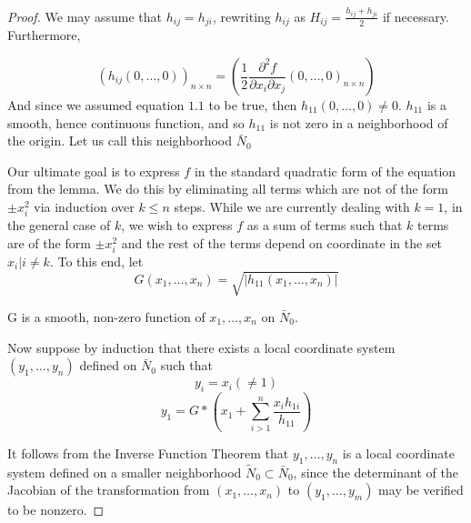 \documentclass[]{article}
\begin{document}
\begin{proof}
     We may assume that $h_{ij}=h_{ji}$, rewriting $h_{ij}$ as
     $H_{ij}=\frac{h_{ij}+h_{ji}}{2}$ if necessary. Furthermore,

     \begin{equation}
        (h_{ij}(0,\ldots,0))_{n \times n}=\left( \frac{1}{2}\frac{\partial^2f}{\partial x_i \partial x_j}(0,\ldots,0)_{n\times n} \right) \tag{1.6}
     \end{equation} 
     And since we assumed equation $1.1$ to be true, then $h_{11}(0,\ldots,0)\not = 0$. $h_{11}$
     is a smooth, hence continuous function, and so $h_{11}$ is not zero in a neighborhood of the origin.
     Let us call this neighborhood $\bar{N}_0$    

     Our ultimate goal is to express $f$ in the standard quadratic form of the equation from the lemma.
     We do this by eliminating all terms which are not of the form $\pm x_i^2$ via induction over $k\le n$
     steps. While we are currently dealing with $k=1$, in the general case of $k$, we wish to express $f$ 
     as a sum of terms such that $k$ terms are of the form $\pm x_i^2$ and the rest of the terms depend
     on coordinate in the set ${x_i|i\not = k}$. To this end, let
     \begin{equation}
        G(x_1,\ldots,x_n)=\sqrt{|h_{11}(x_1,\ldots,x_n) | }   \tag{1.6}
     \end{equation}
        
     G is a smooth, non-zero function of $x_1,\ldots,x_n$ on $\bar{N}_0$.

     Now suppose by induction that there exists a local coordinate system $(y_1,\ldots,y_n)$ defined on $\bar{N}_0$ such that
     \begin{equation}
        y_i=x_i(\not = 1) \tag{1.7}
     \end{equation}
     \begin{equation}
        y_1=G*(x_1+\sum_{i>1}^{n}{\frac{x_ih_{1i}}{h_{11}}})\tag{1.8}
     \end{equation}

     It follows from the Inverse Function Theorem that $y_1,\ldots,y_n$ is a local
     coordinate system defined on a smaller neighborhood $\tilde{N}_0 \subset \bar{N}_0$,
     since the determinant of the Jacobian of the transformation from $(x_1, \ldots,x_n)$
     to $(y_1,\ldots,y_m)$ may be verified to be nonzero.


\end{proof}
\end{document}

